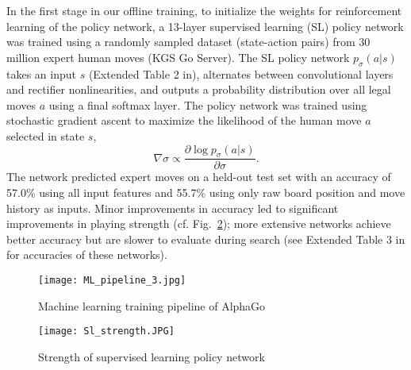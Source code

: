 In the first stage in our offline training, to initialize the weights for reinforcement learning of the policy network, a 13-layer supervised learning (SL) policy network was trained using a randomly sampled dataset (state-action pairs) from 30 million expert human moves (KGS Go Server). The SL policy network $p_\sigma(a|s)$ takes an input $s$ (Extended Table 2 in\cite{b12}), alternates between convolutional layers and rectifier nonlinearities, and outputs a probability distribution over all legal moves $a$ using a final softmax layer. The policy network was trained using stochastic gradient ascent to maximize the likelihood of the human move $a$ selected in state $s$,
\begin{equation}
    \nabla \sigma \propto \frac{\partial \log p_\sigma (a|s)}{\partial \sigma}.
\end{equation}
The network predicted expert moves on a held-out test set with an accuracy of 57.0\% using all input features and 55.7\% using only raw board position and move history as inputs. Minor improvements in accuracy led to significant improvements in playing strength (cf. Fig.~\ref{SL_strength}); more extensive networks achieve better accuracy but are slower to evaluate during search (see Extended Table 3 in\cite{b12} for accuracies of these networks).

\begin{figure}[t]
\centerline{\texttt{[image: ML\_pipeline\_3.jpg]}}
\caption{Machine learning training pipeline of AlphaGo\cite{b12}}
\label{ML_pipe_1}
\end{figure} 

\begin{figure}[b]
\centerline{\texttt{[image: Sl\_strength.JPG]}}
\caption{Strength of supervised learning policy network\cite{b12}}
\label{SL_strength}
\end{figure}



